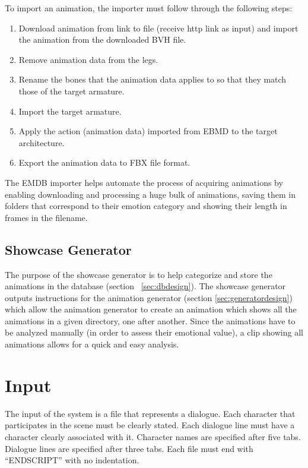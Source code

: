 \medskip
\noindent To import an animation, the importer must follow through the following steps:
\begin{enumerate}
\item Download animation from link to file (receive http link as input) and import the animation from the downloaded BVH file.
\item Remove animation data from the legs.
\item Rename the bones that the animation data applies to so that they match those of the target armature.
\item Import the target armature.
\item Apply the action (animation data) imported from EBMD to the target architecture.
\item Export the animation data to FBX file format.
\end{enumerate}

The EMDB importer helps automate the process of acquiring animations by enabling downloading and processing a huge bulk of animations, saving them in folders that correspond to their emotion category and showing their length in frames in the filename.

\subsection{Showcase Generator \label{sec:showcasegenerator}}
The purpose of the showcase generator is to help categorize and store the animations in the database (section ~\ref{sec:dbdesign}). The showcase generator outputs instructions for the animation generator (section \ref{sec:generatordesign}) which allow the animation generator to create an animation which shows all the animations in a given directory, one after another. Since the animations have to be analyzed manually (in order to assess their emotional value), a clip showing all animations allows for a quick and easy analysis.


\section{Input}

The input of the system is a file that represents a dialogue. Each character that participates in the scene must be clearly stated. Each dialogue line must have a character clearly associated with it. Character names are specified after five tabs. Dialogue lines are specified after three tabs. Each file must end with ``ENDSCRIPT'' with no indentation.

